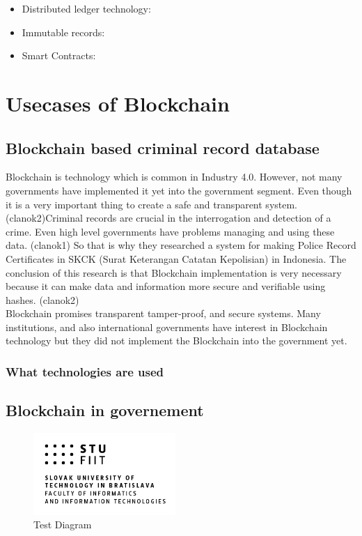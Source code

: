 \documentclass[10pt,english,a4paper]{article}
\begin{document}
\begin{itemize}
    \item Distributed ledger technology:
    \item Immutable records:
    \item Smart Contracts:
\end{itemize}
   
  
\section{Usecases of Blockchain}
\subsection{Blockchain based criminal record database}

Blockchain is technology which is common in Industry 4.0. However, not many governments have implemented it yet into the government segment. Even though it is a very important thing to create a safe and transparent system. \cite{Suroso:SKCK}(clanok2)Criminal records are crucial in the interrogation and detection of a crime. Even high level governments have problems managing and using these data. \cite{Jain:Criminal:record}(clanok1)  So that is why they researched a system for making Police Record Certificates in SKCK (Surat Keterangan Catatan Kepolisian) in Indonesia.  The conclusion of this research is that Blockchain implementation is very necessary because it can make data and information more secure and verifiable using hashes. \cite{Suroso:SKCK}(clanok2)
\\
Blockchain promises transparent tamper-proof, and secure systems. Many institutions, and also international governments have interest in Blockchain technology but they did not implement the Blockchain into the government yet.\cite{Suroso:SKCK} 
\subsubsection{What technologies are used}		

\subsection{Blockchain in governement}
\lipsum[1]
\begin{figure}
  \centering
  \includegraphics[width=0.48\textwidth]{STU-FIIT-ancv.png} 
  \caption{Test Diagram}
\end{figure} 
\lipsum[1]
\end{document}
